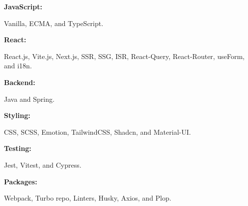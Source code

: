 \begin{minipage}[t]{0.47\textwidth}
    \vspace{-6pt}

    \begin{minipage}[t]{0.14\textwidth}
        \textbf{JavaScript:}
    \end{minipage}
    \hfill
    \begin{minipage}[t]{0.79\textwidth}
        Vanilla, ECMA, and TypeScript.
    \end{minipage}
    \vspace{4pt}

    \begin{minipage}[t]{0.14\textwidth}
        \textbf{React:}
    \end{minipage}
    \hfill
    \begin{minipage}[t]{0.79\textwidth}
        React.js, Vite.js, Next.js, SSR, SSG, ISR, React-Query, React-Router, useForm, and i18n.
    \end{minipage}
    \vspace{4pt}

    \begin{minipage}[t]{0.14\textwidth}
        \textbf{Backend:}
    \end{minipage}
    \hfill
    \begin{minipage}[t]{0.79\textwidth}
        Java and Spring.
    \end{minipage}
    \vspace{4pt}

    \begin{minipage}[t]{0.14\textwidth}
        \textbf{Styling:}
    \end{minipage}
    \hfill
    \begin{minipage}[t]{0.79\textwidth}
        CSS, SCSS, Emotion, TailwindCSS, Shadcn, and Material-UI.
    \end{minipage}
    \vspace{4pt}

    \begin{minipage}[t]{0.14\textwidth}
        \textbf{Testing:}
    \end{minipage}
    \hfill
    \begin{minipage}[t]{0.79\textwidth}
        Jest, Vitest, and Cypress.
    \end{minipage}
    \vspace{4pt}

    \begin{minipage}[t]{0.14\textwidth}
        \textbf{Packages:}
    \end{minipage}
    \hfill
    \begin{minipage}[t]{0.79\textwidth}
        Webpack, Turbo repo, Linters, Husky, Axios, and Plop.
    \end{minipage}
    \vspace{4pt}


\end{minipage}
